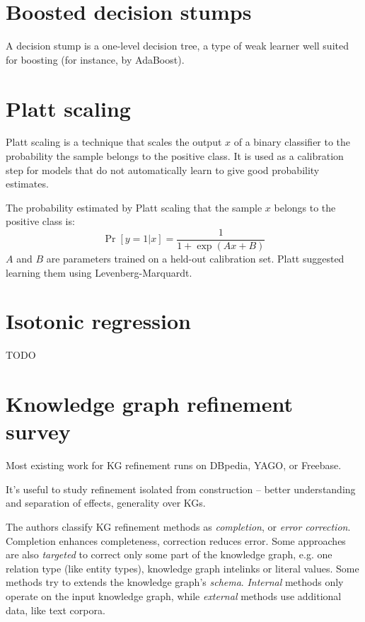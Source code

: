 \section{Boosted decision stumps}
\label{boosted-decision-stumps}
A decision stump is a one-level decision tree, a type of weak learner
well suited for boosting (for instance, by AdaBoost).

\section{Platt scaling}
\label{platt-scaling}

Platt scaling\cite{platt-scaling} is a technique that scales the output $x$ of a binary classifier
to the probability the sample belongs to the positive class. It is used as a
calibration step for models that do not automatically learn to give good
probability estimates.

The probability estimated by Platt scaling that the sample $x$ belongs to the
positive class is:
$$\Pr[y=1|x] = \frac{1}{1+\exp(Ax+B)}$$
$A$ and $B$ are parameters trained on a held-out calibration set.
Platt suggested learning them using Levenberg-Marquardt.

\section{Isotonic regression}
TODO

\section{Knowledge graph refinement survey\cite{kg-refinement-survey}}

Most existing work for KG refinement runs on DBpedia, YAGO, or Freebase.

It's useful to study refinement isolated from construction -- better
understanding and separation of effects, generality over KGs.

The authors classify KG refinement methods as \textit{completion}, or
\textit{error correction}. Completion enhances completeness, correction
reduces error.
Some approaches are also \textit{targeted} to correct only some part of the
knowledge graph, e.g. one relation type (like entity types), knowledge graph
intelinks or literal values.
Some methods try to extends the knowledge graph's \textit{schema}.
\textit{Internal} methods only operate on the input knowledge graph, while
\textit{external} methods use additional data, like text corpora.

